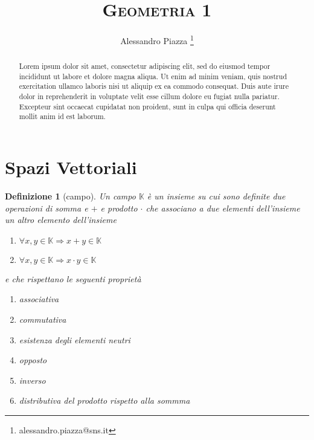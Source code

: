 \documentclass[9pt, a4paper]{article}
\title{\textsc{Geometria 1}}
\author{Alessandro Piazza \thanks{alessandro.piazza@sns.it}}
\newcommand{\K}{\mathbb{K}}
\theoremstyle{mythm}
\newtheorem{definition}{Definizione}[section]
\begin{document}
\maketitle

\begin{abstract}
	Lorem ipsum dolor sit amet, consectetur adipiscing elit, sed do eiusmod tempor incididunt ut labore et dolore magna aliqua. Ut enim ad minim veniam, quis nostrud exercitation ullamco laboris nisi ut aliquip ex ea commodo consequat. Duis aute irure dolor in reprehenderit in voluptate velit esse cillum dolore eu fugiat nulla pariatur. Excepteur sint occaecat cupidatat non proident, sunt in culpa qui officia deserunt mollit anim id est laborum.
\end{abstract}

\tableofcontents

\clearpage

\section{Spazi Vettoriali}
\begin{definition}[campo]
	Un campo $ \K $ è un insieme su cui sono definite due operazioni di \emph{somma} e $ + $ e \emph{prodotto} $ \cdot $ che associano a due elementi dell'insieme un altro elemento dell'insieme
	\begin{enumerate}
		\item $ \forall x, y \in \K \Rightarrow x + y \in \K $
		\item $ \forall x, y \in \K \Rightarrow x \cdot y \in \K $
	\end{enumerate}
	e che rispettano le seguenti proprietà
	\begin{enumerate}[label=(\roman*)]
		\item \emph{associativa}
		\item \emph{commutativa}
		\item \emph{esistenza degli elementi neutri}
		\item \emph{opposto}
		\item \emph{inverso}
		\item \emph{distributiva del prodotto rispetto alla sommma}
	\end{enumerate}
\end{definition}
\end{document}
